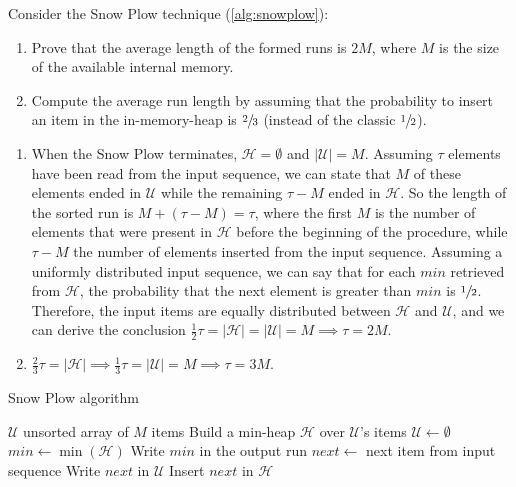 \exercise

Consider the Snow Plow technique (\autoref{alg:snowplow}):
%
\begin{enumerate}

  \item Prove that the average length of the formed runs is $2M$, where $M$ is
  the size of the available internal memory.

  \item Compute the average run length by assuming that the probability to
  insert an item in the in-memory-heap is $\sfrac{2}{3}$ (instead of the classic
  $\sfrac{1}{2}$).

\end{enumerate}

\solution

\begin{enumerate}

  \item When the Snow Plow terminates, $\mathcal{H} = \emptyset$ and
  $|\mathcal{U}| = M$. Assuming $\tau$ elements have been read from the input
  sequence, we can state that $M$ of these elements ended in $\mathcal{U}$ while
  the remaining $\tau - M$ ended in $\mathcal{H}$. So the length of the sorted
  run is $M + (\tau - M) = \tau$, where the first $M$ is the number of elements
  that were present in $\mathcal{H}$ before the beginning of the procedure,
  while $\tau - M$ the number of elements inserted from the input sequence.
  Assuming a uniformly distributed input sequence, we can say that for each
  $min$ retrieved from $\mathcal{H}$, the probability that the next element is
  greater than $min$ is $\sfrac{1}{2}$. Therefore, the input items are equally
  distributed between $\mathcal{H}$ and $\mathcal{U}$, and we can derive the
  conclusion $\frac{1}{2}\tau = |\mathcal{H}| = |\mathcal{U}| = M \implies \tau
  = 2M$.

  \item $\frac{2}{3}\tau = |\mathcal{H}| \implies \frac{1}{3}\tau =
  |\mathcal{U}| = M \implies \tau = 3M$.

\end{enumerate}
%
\begin{algorithm}[t]
\caption{Snow Plow algorithm}\label{alg:snowplow}
\begin{algorithmic}[1]
\Require $\mathcal{U}$ unsorted array of $M$ items
\State Build a min-heap $\mathcal{H}$ over $\mathcal{U}$'s items
\State $\mathcal{U} \gets \emptyset$
  \State $min \gets \min(\mathcal{H})$
  \State Write $min$ in the output run
  \State $next \gets$ next item from input sequence
    \State Write $next$ in $\mathcal{U}$
  \Else
    \State Insert $next$ in $\mathcal{H}$
  \EndIf
\EndWhile
\end{algorithmic}
\end{algorithm}
